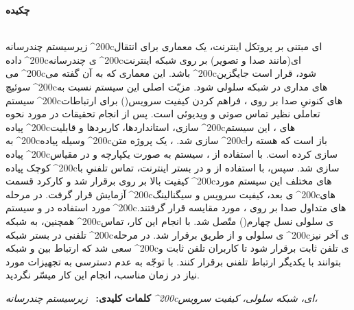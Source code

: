 \thispagestyle{empty}
\noindent
\newcommand*{\nf}{^^^^200c}
\centerline{\textbf{\large{چکیده}}} \\
زیرسیستم چندرسانه\nf ای مبتنی بر پروتکل اینترنت، یک معماری برای انتقال داده\nf ی چندرسانه\nf ای(مانند صدا و تصویر) بر روی شبکه اینترنت می\nf باشد. این معماری که به آن  گفته می\nf شود، قرار است جایگزین سوئیچ\nf های مداری در شبکه سلولی شود. مزیّت اصلی این سیستم نسبت به سیستم\nf های کنونیِ صدا بر روی ، فراهم کردن کیفیت سرویس() برای ارتباطات تعاملی نظیر تماس صوتی و ویدیوئی است. پس از انجام تحقیقات در مورد نحوه پیاده\nf سازی، استانداردها، کاربردها و قابلیت\nf های ، این سیستم به\nf وسیله  پیاده\nf سازی شد. ، یک پروژه متن\nf باز است که هسته  را پیاده\nf سازی کرده است. با استفاده از ، سیستم  به صورت یکپارچه و در مقیاس کوچک پیاده\nf سازی شد. سپس، با استفاده از  و در بستر اینترنت، تماس تلفنیِ با کیفیت بالا بر روی  برقرار شد و کارکرد قسمت\nf های مختلف این سیستم مورد آزمایش قرار گرفت. در مرحله\nf ی بعد، کیفیت سرویس و سیگنالینگ\nf های مورد استفاده در  و سیستم\nf های متداول صدا بر روی ، مورد مقایسه قرار گرفتند. همچنین،  به شبکه\nf ی سلولی نسل چهارم() متّصل شد. با انجام این کار، تماس تلفنی در بستر شبکه\nf ی سلولی و از طریق  برقرار شد. در مرحله\nf ی آخر نیز سعی شد که ارتباط بین  و شبکه\nf ی تلفن ثابت برقرار شود تا کاربران تلفن ثابت و  بتوانند با یکدیگر ارتباط تلفنی برقرار کنند. با توجّه به عدم دسترسی به تجهیزات مورد نیاز در زمان مناسب، انجام این کار میسّر نگردید.
 

\textbf{کلمات کلیدی:} \
\textit{زیرسیستم چندرسانه\nf ای، شبکه سلولی، کیفیت سرویس، }